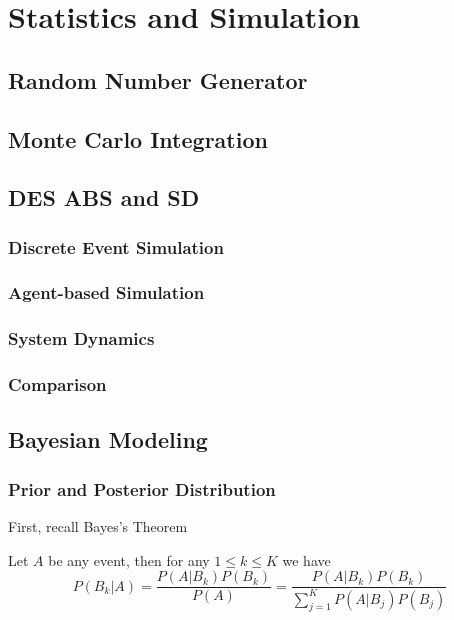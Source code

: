 

\part{Statistics and Simulation}
	\chapter{Random Number Generator}

	\chapter{Monte Carlo Integration}

	\chapter{DES ABS and SD}
		\section{Discrete Event Simulation}

		\section{Agent-based Simulation}

		\section{System Dynamics}

		\section{Comparison}

	\chapter{Bayesian Modeling}
		\section{Prior and Posterior Distribution}
			First, recall Bayes's Theorem
			\begin{definition}
				Let $A$ be any event, then for any $1 \le k \le K$ we have
				\begin{equation}
					P(B_k | A) = \frac{P(A|B_k)P(B_k)}{P(A)} = \frac{P(A|B_k)P(B_k)}{\sum_{j = 1}^K P(A|B_j)P(B_j)}
				\end{equation}
			\end{definition}

